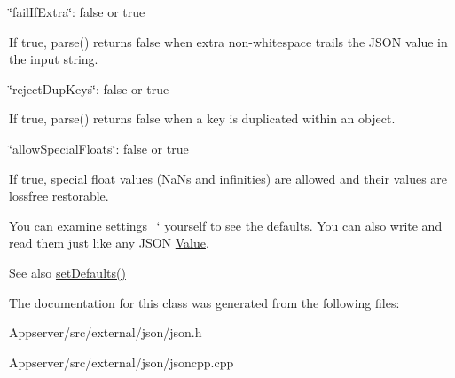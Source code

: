 \begin{DoxyItemize}
\begin{DoxyItemize}
\end{DoxyItemize}
\item {\ttfamily \char`\"{}fail\+If\+Extra\char`\"{}\+: false or true}
\begin{DoxyItemize}
\item If true, {\ttfamily parse()} returns false when extra non-\/whitespace trails the J\+S\+ON value in the input string.
\end{DoxyItemize}
\item {\ttfamily \char`\"{}reject\+Dup\+Keys\char`\"{}\+: false or true}
\begin{DoxyItemize}
\item If true, {\ttfamily parse()} returns false when a key is duplicated within an object.
\end{DoxyItemize}
\item {\ttfamily \char`\"{}allow\+Special\+Floats\char`\"{}\+: false or true}
\begin{DoxyItemize}
\item If true, special float values (Na\+Ns and infinities) are allowed and their values are lossfree restorable.
\end{DoxyItemize}
\end{DoxyItemize}

You can examine \textquotesingle{}settings\+\_\+` yourself to see the defaults. You can also write and read them just like any J\+S\+ON \hyperlink{classJson_1_1Value}{Value}. \begin{DoxySeeAlso}{See also}
\hyperlink{classJson_1_1CharReaderBuilder_a03ff031e06aabff989ab4addc87294ab}{set\+Defaults()} 
\end{DoxySeeAlso}


The documentation for this class was generated from the following files\+:\begin{DoxyCompactItemize}
\item 
Appserver/src/external/json/json.\+h\item 
Appserver/src/external/json/jsoncpp.\+cpp\end{DoxyCompactItemize}
